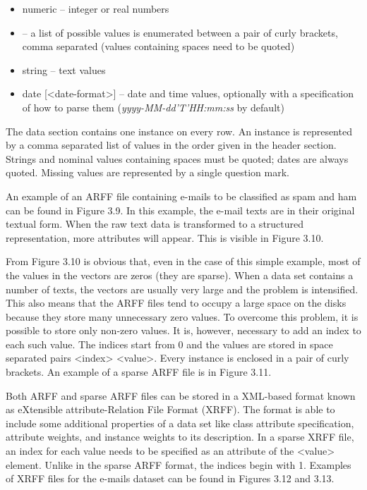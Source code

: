 \begin{itemize}
    \item numeric – integer or real numbers
    \item <nominal-specification> – a list of possible values is enumerated between a pair of curly brackets, comma separated (values containing
spaces need to be quoted)
    \item string – text values
    \item date [<date-format>] – date and time values, optionally with a specification of how to parse them (\textit{yyyy-MM-dd’T’HH:mm:ss} by default)
\end{itemize}

The data section contains one instance on every row. An instance is represented by a comma separated list of values in the order given in the header section. Strings and nominal values containing spaces must be quoted; dates are
always quoted. Missing values are represented by a single question mark.

An example of an ARFF file containing e-mails to be classified as spam and
ham can be found in Figure 3.9. In this example, the e-mail texts are in their
original textual form. When the raw text data is transformed to a structured representation, more attributes will appear. This is visible in Figure 3.10.

From Figure 3.10 is obvious that, even in the case of this simple example,
most of the values in the vectors are zeros (they are sparse). When a data set
contains a number of texts, the vectors are usually very large and the problem
is intensified. This also means that the ARFF files tend to occupy a large space
on the disks because they store many unnecessary zero values. To overcome this
problem, it is possible to store only non-zero values. It is, however, necessary
to add an index to each such value. The indices start from 0 and the values are
stored in space separated pairs <index> <value>. Every instance is enclosed in
a pair of curly brackets. An example of a sparse ARFF file is in Figure 3.11.

Both ARFF and sparse ARFF files can be stored in a XML-based format
known as eXtensible attribute-Relation File Format (XRFF). The format is able
to include some additional properties of a data set like class attribute specification, attribute weights, and instance weights to its description. In a sparse XRFF
file, an index for each value needs to be specified as an attribute of the <value>
element. Unlike in the sparse ARFF format, the indices begin with 1. Examples
of XRFF files for the e-mails dataset can be found in Figures 3.12 and 3.13.

